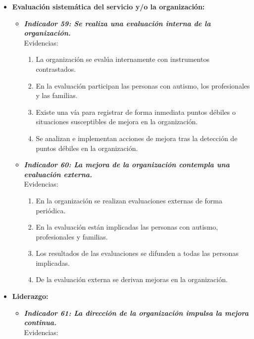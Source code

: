 \begin{itemize}
\begin{itemize}
		\item \textbf{Evaluación sistemática del servicio y/o la organización: }
		\begin{itemize}
			\item \textbf{\textit{Indicador 59: Se realiza una evaluación interna de la organización.}}\\Evidencias:
			
			\begin{enumerate}
				\item La organización se evalúa internamente con instrumentos contrastados.  
				\item En la evaluación participan las personas con autismo, los profesionales y las familias.  
				\item Existe una vía para registrar de forma inmediata puntos débiles o situaciones susceptibles de mejora en la organización. 
				\item Se analizan e implementan acciones de mejora tras la detección de puntos débiles en la organización. 
			\end{enumerate}

			\item \textbf{\textit{Indicador 60: La mejora de la organización contempla una evaluación externa.}}\\Evidencias:
			
			\begin{enumerate}
				\item En la organización se realizan evaluaciones externas de forma periódica. 
				\item En la evaluación están implicadas las personas con autismo, profesionales y familias.   
				\item Los resultados de las evaluaciones se difunden a todas las personas implicadas. 
				\item De la evaluación externa se derivan mejoras en la organización. 
		  
			\end{enumerate}
		\end{itemize}

		\item \textbf{Liderazgo:}
		\begin{itemize}
			\item \textbf{\textit{Indicador 61: La dirección de la organización impulsa la mejora continua.}}\\Evidencias:
			

\end{itemize}
\end{itemize}
\end{itemize}
